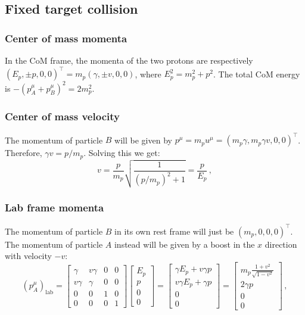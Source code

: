 \documentclass[main.tex]{subfiles}
\begin{document}
\subsection{Fixed target collision}

\subsubsection{Center of mass momenta}

In the CoM frame, the momenta of the two protons are respectively \((E_p, \pm p, 0,0)^\top = m_p (\gamma, \pm v, 0, 0)\), where \(E_p^2 = m_p^2 + p^2\).
The total CoM energy is \(-(p^\mu _A + p^\mu _B )^2 = 2 m_p^2\).

\subsubsection{Center of mass velocity}

The momentum of particle \(B\) will be given by \(p^{\mu } = m_p u^{\mu } = (m_p \gamma , m_p \gamma v, 0, 0)^\top\). Therefore, \(\gamma v = p / m_p\). Solving this we get: 
%
\begin{equation}
  v = \frac{p}{m_p} \sqrt{\frac{1}{(p/m_p)^{2} + 1}} = \frac{p}{E_p}
\,,
\end{equation}
%

\subsubsection{Lab frame momenta}

The momentum of particle \(B\) in its own rest frame will just be \((m_p, 0, 0, 0)^\top\).
The momentum of particle \(A\) instead will be given by a boost in the \(x\) direction with velocity \(-v\):
%
\begin{equation}
  (p_A^\mu) _{\text{lab}} = 
  \left[\begin{array}{cccc}
  \gamma  & v \gamma  & 0 & 0 \\ 
  v \gamma  & \gamma  & 0 & 0 \\ 
  0 & 0 & 1 & 0 \\ 
  0 & 0 & 0 & 1
  \end{array}\right]
  \left[\begin{array}{c}
  E_p  \\ 
  p \\ 
  0 \\ 
  0
  \end{array}\right]  
  = \left[\begin{array}{c}
    \gamma E_p + v \gamma p  \\ 
    v \gamma E_p + \gamma p \\ 
    0 \\ 
    0
    \end{array}\right]  
  = \left[\begin{array}{c}
    m_p \frac{1+v^2}{\sqrt{1-v^2}}  \\ 
    2 \gamma p\\ 
    0 \\ 
    0
    \end{array}\right]
\,,
\end{equation}
%
\end{document}
